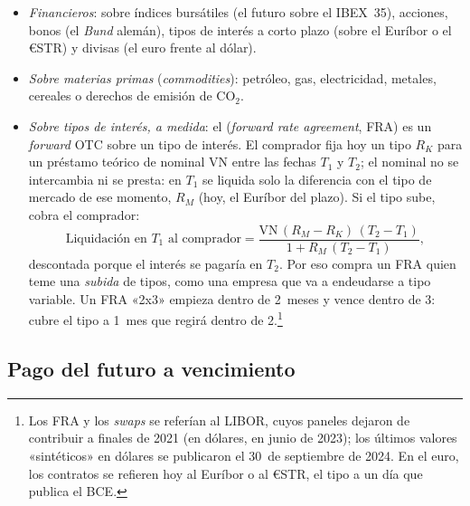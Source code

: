 \documentclass[11pt]{article}
\begin{document}
\begin{itemize}
\item \emph{Financieros}: sobre índices bursátiles (el futuro sobre el IBEX~35), acciones, bonos (el \emph{Bund} alemán), tipos de interés a corto plazo (sobre el Euríbor o el €STR) y divisas (el euro frente al dólar).
\item \emph{Sobre materias primas} (\emph{commodities}): petróleo, gas, electricidad, metales, cereales o derechos de emisión de CO$_2$.
\item \emph{Sobre tipos de interés, a medida}: el  (\emph{forward rate agreement}, FRA) es un \emph{forward} OTC sobre un tipo de interés. El comprador fija hoy un tipo $R_K$ para un préstamo teórico de nominal $\mathrm{VN}$ entre las fechas $T_1$ y $T_2$; el nominal no se intercambia ni se presta: en $T_1$ se liquida solo la diferencia con el tipo de mercado de ese momento, $R_M$ (hoy, el Euríbor del plazo). Si el tipo sube, cobra el comprador:
  \begin{equation}\label{eq:fra}
  \text{Liquidación en }T_1\text{ al comprador}=\frac{\mathrm{VN}\,(R_M-R_K)\,(T_2-T_1)}{1+R_M\,(T_2-T_1)},
  \end{equation}
  descontada porque el interés se pagaría en $T_2$. Por eso compra un FRA quien teme una \emph{subida} de tipos, como una empresa que va a endeudarse a tipo variable. Un FRA «2x3» empieza dentro de 2~meses y vence dentro de 3: cubre el tipo a 1~mes que regirá dentro de 2\nocite{Hull2022Options}.\footnote{Los FRA y los \emph{swaps} se referían al LIBOR, cuyos paneles dejaron de contribuir a finales de 2021 (en dólares, en junio de 2023); los últimos valores «sintéticos» en dólares se publicaron el 30~de septiembre de 2024\nocite{FCA2026LIBOR}. En el euro, los contratos se refieren hoy al Euríbor o al €STR, el tipo a un día que publica el BCE.}
\end{itemize}

\subsection{Pago del futuro a vencimiento}\label{sec:pago-futuro}
\end{document}
